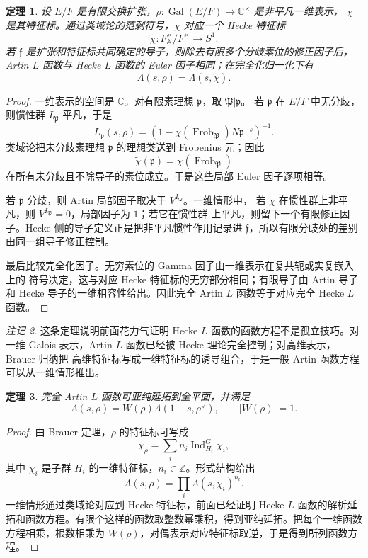 \documentclass[11pt,a4paper,openany]{ctexbook}
\numberwithin{equation}{chapter}
\newcommand{\C}{\mathbb{C}}
\newcommand{\Z}{\mathbb{Z}}
\newcommand{\A}{\mathbb{A}}
\newcommand{\Gal}{\operatorname{Gal}}
\theoremstyle{plain}
\newtheorem{theorem}{定理}[chapter]
\theoremstyle{definition}
\theoremstyle{remark}
\newtheorem{remark}[theorem]{注记}
\begin{document}
\begin{theorem}
设 $E/F$ 是有限交换扩张，$\rho:\Gal(E/F)\to\C^\times$ 是非平凡一维表示，
$\chi$ 是其特征标。通过类域论的范剩符号，$\chi$ 对应一个 Hecke 特征标
\[
  \widetilde\chi:F_{\A}^{\times}/F^\times\longrightarrow S^1.
\]
若 $\mathfrak f$ 是扩张和特征标共同确定的导子，则除去有限多个分歧素位的修正因子后，
Artin $L$ 函数与 Hecke $L$ 函数的 Euler 因子相同；在完全化归一化下有
\[
  \Lambda(s,\rho)=\Lambda(s,\widetilde\chi).
\]
\end{theorem}

\begin{proof}
一维表示的空间是 $\C$。对有限素理想 $\mathfrak p$，取 $\mathfrak P|\mathfrak p$。
若 $\mathfrak p$ 在 $E/F$ 中无分歧，则惯性群 $I_{\mathfrak P}$ 平凡，于是
\[
  L_{\mathfrak p}(s,\rho)=
  (1-\chi(\operatorname{Frob}_{\mathfrak P})N\mathfrak p^{-s})^{-1}.
\]
类域论把未分歧素理想 $\mathfrak p$ 的理想类送到 Frobenius 元；因此
\[
  \widetilde\chi(\mathfrak p)=\chi(\operatorname{Frob}_{\mathfrak P})
\]
在所有未分歧且不除导子的素位成立。于是这些局部 Euler 因子逐项相等。

若 $\mathfrak p$ 分歧，则 Artin 局部因子取决于 $V^{I_{\mathfrak P}}$。一维情形中，
若 $\chi$ 在惯性群上非平凡，则 $V^{I_{\mathfrak P}}=0$，局部因子为 $1$；若它在惯性群
上平凡，则留下一个有限修正因子。Hecke 侧的导子定义正是把非平凡惯性作用记录进
$\mathfrak f$，所以有限分歧处的差别由同一组导子修正控制。

最后比较完全化因子。无穷素位的 Gamma 因子由一维表示在复共轭或实复嵌入上的
符号决定，这与对应 Hecke 特征标的无穷部分相同；有限导子由 Artin 导子和 Hecke
导子的一维相容性给出。因此完全 Artin $L$ 函数等于对应完全 Hecke $L$ 函数。
\end{proof}

\begin{remark}
这条定理说明前面花力气证明 Hecke $L$ 函数的函数方程不是孤立技巧。对一维
Galois 表示，Artin $L$ 函数已经被 Hecke 理论完全控制；对高维表示，Brauer 归纳把
高维特征标写成一维特征标的诱导组合，于是一般 Artin 函数方程可以从一维情形推出。
\end{remark}

\begin{theorem}
完全 Artin $L$ 函数可亚纯延拓到全平面，并满足
\[
  \Lambda(s,\rho)=W(\rho)\Lambda(1-s,\rho^\vee),
\qquad |W(\rho)|=1.
\]
\end{theorem}

\begin{proof}
由 Brauer 定理，$\rho$ 的特征标可写成
\[
  \chi_\rho=\sum_i n_i\operatorname{Ind}_{H_i}^{G}\chi_i,
\]
其中 $\chi_i$ 是子群 $H_i$ 的一维特征标，$n_i\in\Z$。形式结构给出
\[
  \Lambda(s,\rho)=\prod_i\Lambda(s,\chi_i)^{n_i}.
\]
一维情形通过类域论对应到 Hecke 特征标，前面已经证明 Hecke $L$ 函数的解析延拓和函数方程。有限个这样的函数取整数幂乘积，得到亚纯延拓。把每个一维函数方程相乘，根数相乘为 $W(\rho)$，对偶表示对应特征标取逆，于是得到所列函数方程。
\end{proof}
\end{document}
